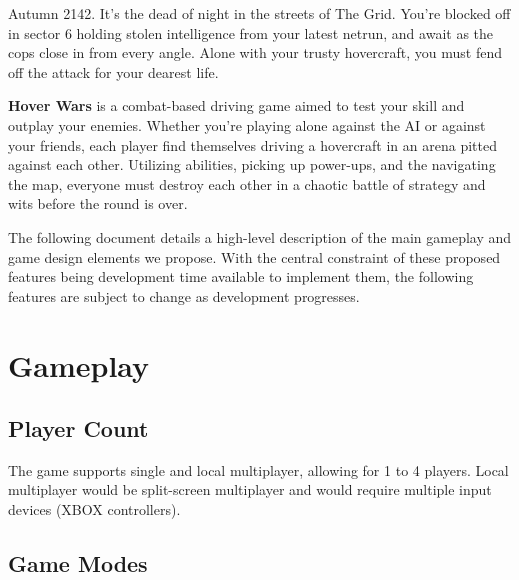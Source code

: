 \documentclass{article}
\newcommand{\namenobold}{Hover Wars}
\newcommand{\name}{\textbf{\namenobold}}
\theoremstyle{definition}
\begin{document}

Autumn 2142. It's the dead of night in the streets of The Grid. You're
blocked off in sector 6 holding stolen intelligence from your latest netrun,
and await as the cops close in from every angle. Alone with your trusty
hovercraft, you must fend off the attack for your dearest life.

\name{} is a combat-based driving game aimed to test your skill and outplay
your enemies. Whether you're playing alone against the AI or against your
friends, each player find themselves driving a hovercraft in an arena pitted
against each other. Utilizing abilities, picking up power-ups, and the
navigating the map, everyone must destroy each other in a chaotic battle of
strategy and wits before the round is over.

The following document details a high-level description of the main gameplay
and game design elements we propose. With the central constraint of these
proposed features being development time available to implement them, the
following features are subject to change as development progresses.

\section{Gameplay}

\subsection{Player Count}

The game supports single and local multiplayer, allowing for 1 to 4 players.
Local multiplayer would be split-screen multiplayer and would require multiple
input devices (XBOX controllers).

\subsection{Game Modes}
\end{document}
